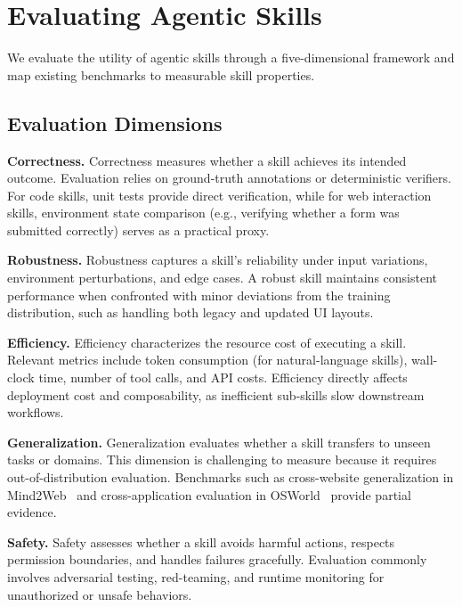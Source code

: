 \documentclass[conference, compsoc]{IEEEtran}
\theoremstyle{plain}
\newcommand{\para}[1]{\smallskip\noindent\textbf{#1.}}
\begin{document}
{%
\section{Evaluating Agentic Skills}
\label{sec:evaluation}

We evaluate the utility of agentic skills through a five-dimensional framework and map existing benchmarks to measurable skill properties.

\subsection{Evaluation Dimensions}
\label{sec:evaluation:dimensions}

\para{Correctness}
Correctness measures whether a skill achieves its intended outcome. Evaluation relies on ground-truth annotations or deterministic verifiers. For code skills, unit tests provide direct verification, while for web interaction skills, environment state comparison (e.g., verifying whether a form was submitted correctly) serves as a practical proxy.

\para{Robustness}
Robustness captures a skill’s reliability under input variations, environment perturbations, and edge cases. A robust skill maintains consistent performance when confronted with minor deviations from the training distribution, such as handling both legacy and updated UI layouts.

\para{Efficiency}
Efficiency characterizes the resource cost of executing a skill. Relevant metrics include token consumption (for natural-language skills), wall-clock time, number of tool calls, and API costs. Efficiency directly affects deployment cost and composability, as inefficient sub-skills slow downstream workflows.

\para{Generalization}
Generalization evaluates whether a skill transfers to unseen tasks or domains. This dimension is challenging to measure because it requires out-of-distribution evaluation. Benchmarks such as cross-website generalization in Mind2Web~\cite{deng2023mind2web} and cross-application evaluation in OSWorld~\cite{xie2024osworld} provide partial evidence.

\para{Safety}
Safety assesses whether a skill avoids harmful actions, respects permission boundaries, and handles failures gracefully. Evaluation commonly involves adversarial testing, red-teaming, and runtime monitoring for unauthorized or unsafe behaviors.

}
\end{document}
